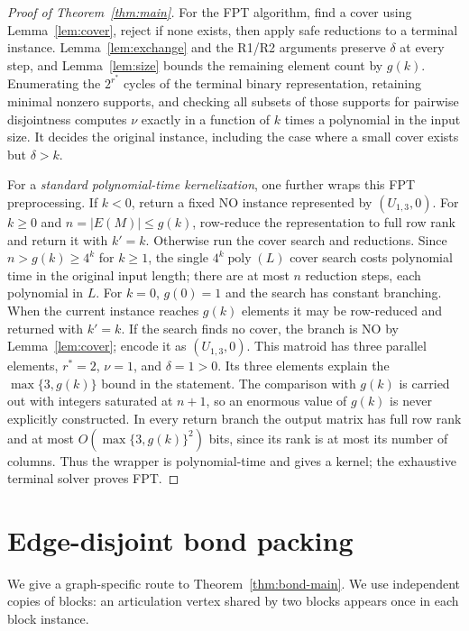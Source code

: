 \documentclass[11pt]{article}
\newcommand{\poly}{\operatorname{poly}}
\begin{document}
\begin{proof}[Proof of Theorem~\ref{thm:main}]
For the FPT algorithm, find a cover using Lemma~\ref{lem:cover},
reject if none exists, then apply safe reductions to a terminal
instance.  Lemma~\ref{lem:exchange} and the R1/R2 arguments preserve
$\delta$ at every step, and Lemma~\ref{lem:size} bounds the remaining
element count by $g(k)$.  Enumerating the $2^{r^*}$ cycles of the
terminal binary representation, retaining minimal nonzero supports,
and checking all subsets of those supports for pairwise disjointness
computes $\nu$ exactly in a function of $k$ times a polynomial in
the input size.  It decides the original instance, including the
case where a small cover exists but $\delta>k$.

For a \emph{standard polynomial-time kernelization}, one further
wraps this FPT preprocessing.  If $k<0$, return a fixed NO instance
represented by $(U_{1,3},0)$.  For $k\geq0$ and $n=|E(M)|\leq g(k)$,
row-reduce the representation to full row rank and return it with
$k'=k$.  Otherwise run the cover search and reductions.  Since
$n>g(k)\geq4^k$ for $k\geq1$, the single $4^k\poly(L)$ cover search
costs polynomial time in the original input length; there are at most
$n$ reduction steps, each polynomial in $L$.  For $k=0$, $g(0)=1$
and the search has constant branching.  When the current instance
reaches $g(k)$ elements it may be row-reduced and returned with
$k'=k$.  If the search finds no cover, the branch is NO by
Lemma~\ref{lem:cover}; encode it as $(U_{1,3},0)$.  This matroid has
three parallel elements, $r^*=2$, $\nu=1$, and $\delta=1>0$.
Its three elements explain the
$\max\{3,g(k)\}$ bound in the statement.  The comparison with $g(k)$
is carried out with integers saturated at $n+1$, so an enormous value
of $g(k)$ is never explicitly constructed.  In every return branch
the output matrix has full row rank and at most
$O(\max\{3,g(k)\}^2)$ bits, since its rank is at most its number of
columns.  Thus the wrapper is
polynomial-time and gives a kernel; the exhaustive terminal solver
proves FPT.
\end{proof}

\section{Edge-disjoint bond packing}\label{sec:bonds}
We give a graph-specific route to Theorem~\ref{thm:bond-main}.
We use independent copies of blocks: an articulation vertex shared by
two blocks appears once in each block instance.
\end{document}

